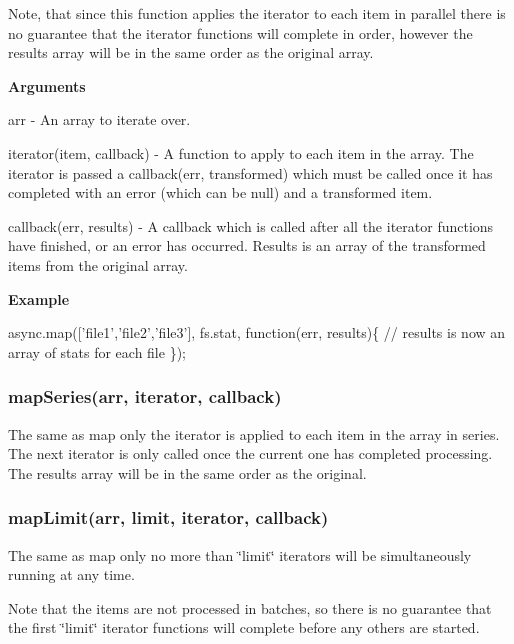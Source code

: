 Note, that since this function applies the iterator to each item in parallel there is no guarantee that the iterator functions will complete in order, however the results array will be in the same order as the original array.

{\bfseries Arguments}


\begin{DoxyItemize}
\item arr -\/ An array to iterate over.
\item iterator(item, callback) -\/ A function to apply to each item in the array. The iterator is passed a callback(err, transformed) which must be called once it has completed with an error (which can be null) and a transformed item.
\item callback(err, results) -\/ A callback which is called after all the iterator functions have finished, or an error has occurred. Results is an array of the transformed items from the original array.
\end{DoxyItemize}

{\bfseries Example}


\begin{DoxyCode}
async.map(['file1','file2','file3'], fs.stat, function(err, results)\{
    // results is now an array of stats for each file
\});
\end{DoxyCode}
 



\label{_mapSeries}%
 \subsubsection*{map\+Series(arr, iterator, callback)}

The same as map only the iterator is applied to each item in the array in series. The next iterator is only called once the current one has completed processing. The results array will be in the same order as the original.





\label{_mapLimit}%
 \subsubsection*{map\+Limit(arr, limit, iterator, callback)}

The same as map only no more than \char`\"{}limit\char`\"{} iterators will be simultaneously running at any time.

Note that the items are not processed in batches, so there is no guarantee that the first \char`\"{}limit\char`\"{} iterator functions will complete before any others are started.

